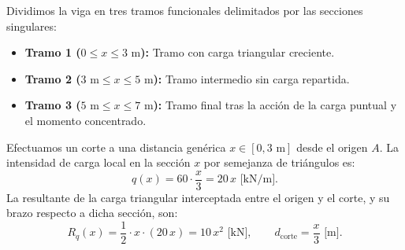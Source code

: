 Dividimos la viga en tres tramos funcionales delimitados por las secciones singulares:
\begin{itemize}
    \item \textbf{Tramo 1 ($0 \le x \le 3\text{ m}$):} Tramo con carga triangular creciente.
    \item \textbf{Tramo 2 ($3\text{ m} \le x \le 5\text{ m}$):} Tramo intermedio sin carga repartida.
    \item \textbf{Tramo 3 ($5\text{ m} \le x \le 7\text{ m}$):} Tramo final tras la acción de la carga puntual y el momento concentrado.
\end{itemize}


Efectuamos un corte a una distancia genérica $x \in [0, 3\text{ m}]$ desde el origen $A$. La intensidad de carga local en la sección $x$ por semejanza de triángulos es:
\[
    q(x) = 60 \cdot \frac{x}{3} = 20\,x\text{ [kN/m]}.
\]
La resultante de la carga triangular interceptada entre el origen y el corte, y su brazo respecto a dicha sección, son:
\[
    R_q(x) = \frac{1}{2} \cdot x \cdot (20\,x) = 10\,x^2\text{ [kN]}, \qquad d_{\text{corte}} = \frac{x}{3}\text{ [m]}.
\]

